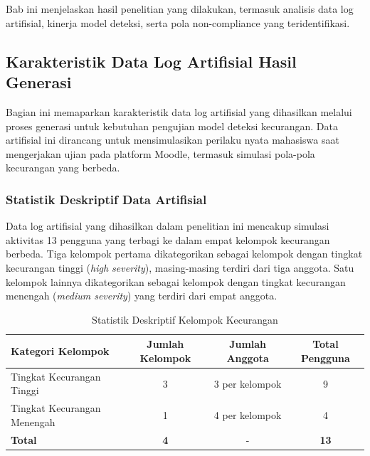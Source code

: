 \chapter{\babEmpat}
\label{bab:4}
Bab ini menjelaskan hasil penelitian yang dilakukan, termasuk analisis data log artifisial, kinerja model deteksi, serta pola non-compliance yang teridentifikasi.

\section{Karakteristik Data Log Artifisial Hasil Generasi}

Bagian ini memaparkan karakteristik data log artifisial yang dihasilkan melalui proses generasi untuk kebutuhan pengujian model deteksi kecurangan. Data artifisial ini dirancang untuk mensimulasikan perilaku nyata mahasiswa saat mengerjakan ujian pada platform Moodle, termasuk simulasi pola-pola kecurangan yang berbeda.

\subsection{Statistik Deskriptif Data Artifisial}
\label{subsec:statistikDeskriptifDataArtifisial}

Data log artifisial yang dihasilkan dalam penelitian ini mencakup simulasi aktivitas 13 pengguna yang terbagi ke dalam empat kelompok kecurangan berbeda. Tiga kelompok pertama dikategorikan sebagai kelompok dengan tingkat kecurangan tinggi (\textit{high severity}), masing-masing terdiri dari tiga anggota. Satu kelompok lainnya dikategorikan sebagai kelompok dengan tingkat kecurangan menengah (\textit{medium severity}) yang terdiri dari empat anggota.

\begin{table}[htbp]
\centering
\caption{Statistik Deskriptif Kelompok Kecurangan}
\label{tabel:statistikKelompokKecurangan}
\begin{tabular}{|l|c|c|c|}
\hline
\textbf{Kategori Kelompok} & \textbf{Jumlah Kelompok} & \textbf{Jumlah Anggota} & \textbf{Total Pengguna} \\
\hline
Tingkat Kecurangan Tinggi & 3 & 3 per kelompok & 9 \\
\hline
Tingkat Kecurangan Menengah & 1 & 4 per kelompok & 4 \\
\hline
\textbf{Total} & \textbf{4} & - & \textbf{13} \\
\hline
\end{tabular}
\end{table}

